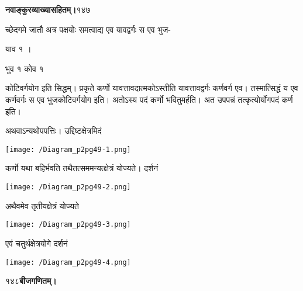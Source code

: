 \documentclass[11pt, openany]{book}
\begin{document}
\onehalfspacing
\hspace{2in}\textbf{नवाङ्कुरव्याख्यासहितम्।}\hspace{2in}१४७

\vspace{5mm}

\begin{sloppypar}
\hangindent=0.2in च्छेदगमे जातौ अत्र पक्षयोः समत्वाद्य एव यावद्वर्गः स एव भुज-

\hspace{1in}याव १ ।

\hspace{0.65in}भुव १ कोव १

\hangindent=0.2in कोटिवर्गयोग इति सिद्धम्। प्रकृते कर्णो यावत्तावदात्मकोऽस्तीति यावत्तावद्वर्गः कर्णवर्ग एव। तस्मात्सिद्धं य एव कर्णवर्गः स एव भुजकोटिवर्गयोग इति। अतोऽस्य पदं कर्णो भवितुमर्हति। अत उपपन्नं तत्कृत्योर्योगपदं कर्ण इति। 

\hangindent=0.2in \hspace{0.2in}अथवाऽन्यथोपपत्तिः। उद्दिष्टक्षेत्रमिदं

\begin{center}
    \texttt{[image: /Diagram\_p2pg49-1.png]}
\end{center}

\hangindent=0.2in \hspace{0.2in}कर्णो यथा बहिर्भवति तथैतत्सममन्यत्क्षेत्रं योज्यते। दर्शनं

\begin{center}
    \texttt{[image: /Diagram\_p2pg49-2.png]}
\end{center}

\hangindent=0.2in \hspace{0.2in}अथैवमेव तृतीयक्षेत्रं योज्यते

\begin{center}
    \texttt{[image: /Diagram\_p2pg49-3.png]}
\end{center}

\hangindent=0.2in \hspace{0.2in}एवं चतुर्थक्षेत्रयोगे दर्शनं

\begin{center}
    \texttt{[image: /Diagram\_p2pg49-4.png]}
\end{center}
\end{sloppypar}
\thispagestyle{empty}
\newpage

\onehalfspacing
१४८\hspace{2in}\textbf{बीजगणितम्।} 

\vspace{5mm}
\end{document}
